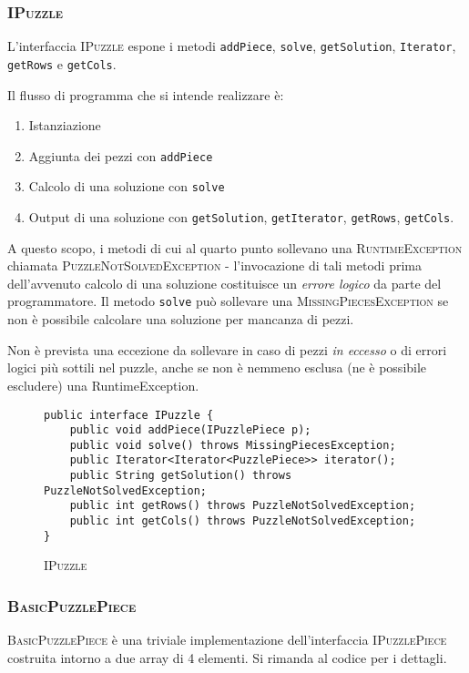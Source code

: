 \documentclass[a4paper]{article}
\newcommand{\Classname}[1]{\textsc{#1}}
\newcommand{\Ifacename}[1]{\textsc{#1}}
\newcommand{\Methodname}[1]{\texttt{#1}}
\begin{document}
\subsubsection{\Classname{IPuzzle}}
L'interfaccia \Ifacename{IPuzzle} espone i metodi \Methodname{addPiece}, \Methodname{solve}, \Methodname{getSolution}, \Methodname{Iterator}, \Methodname{getRows} e \Methodname{getCols}.

Il flusso di programma che si intende realizzare \`e:

\begin{enumerate}
\item Istanziazione
\item Aggiunta dei pezzi con \Methodname{addPiece}
\item Calcolo di una soluzione con \Methodname{solve}
\item Output di una soluzione con \Methodname{getSolution}, \Methodname{getIterator}, \Methodname{getRows}, \Methodname{getCols}.
\end{enumerate}

A questo scopo, i metodi di cui al quarto punto sollevano una \Classname{RuntimeException} chiamata \Classname{PuzzleNotSolvedException} - l'invocazione di tali metodi prima dell'avvenuto calcolo di una soluzione costituisce un \emph{errore logico} da parte del programmatore.
\label{pnse}
Il metodo \Methodname{solve} pu\`o sollevare una \Classname{MissingPiecesException} se non \`e possibile calcolare una soluzione per mancanza di pezzi.

Non \`e prevista una eccezione da sollevare in caso di pezzi \emph{in eccesso} o di errori logici pi\`u  sottili nel puzzle, anche se non \`e nemmeno esclusa (ne \`e possibile escludere) una RuntimeException.

\begin{figure}[h]
  \centering
\begin{lstlisting}[frame=single]
public interface IPuzzle {
	public void addPiece(IPuzzlePiece p);
	public void solve() throws MissingPiecesException;
	public Iterator<Iterator<PuzzlePiece>> iterator();
	public String getSolution() throws PuzzleNotSolvedException;
	public int getRows() throws PuzzleNotSolvedException;
	public int getCols() throws PuzzleNotSolvedException;
}
\end{lstlisting}
\caption {\textsc{IPuzzle}}
\end{figure}

\subsubsection{\Classname{BasicPuzzlePiece}}
\Classname{BasicPuzzlePiece} \`e una triviale implementazione dell'interfaccia \Ifacename{IPuzzlePiece} costruita intorno a due array di 4 elementi.
Si rimanda al codice per i dettagli.
\end{document}
